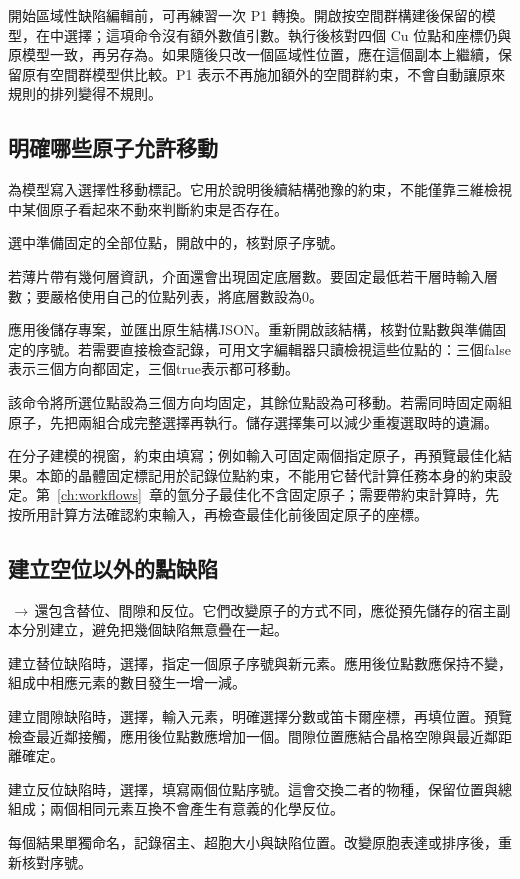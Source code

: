 開始區域性缺陷編輯前，可再練習一次 P1 轉換。開啟按空間群構建後保留的模型，在中選擇；這項命令沒有額外數值引數。執行後核對四個 Cu 位點和座標仍與原模型一致，再另存為。如果隨後只改一個區域性位置，應在這個副本上繼續，保留原有空間群模型供比較。P1 表示不再施加額外的空間群約束，不會自動讓原來規則的排列變得不規則。

\subsection{明確哪些原子允許移動}\label{sec:fixed-sites-reference}

為模型寫入選擇性移動標記。它用於說明後續結構弛豫的約束，不能僅靠三維檢視中某個原子看起來不動來判斷約束是否存在。

\begin{steps}
  \item 選中準備固定的全部位點，開啟中的，核對原子序號。
  \item 若薄片帶有幾何層資訊，介面還會出現固定底層數。要固定最低若干層時輸入層數；要嚴格使用自己的位點列表，將底層數設為0。
  \item 應用後儲存專案，並匯出原生結構JSON。重新開啟該結構，核對位點數與準備固定的序號。若需要直接檢查記錄，可用文字編輯器只讀檢視這些位點的：三個false表示三個方向都固定，三個true表示都可移動。
\end{steps}

該命令將所選位點設為三個方向均固定，其餘位點設為可移動。若需同時固定兩組原子，先把兩組合成完整選擇再執行。儲存選擇集可以減少重複選取時的遺漏。

在分子建模的視窗，約束由填寫；例如輸入可固定兩個指定原子，再預覽最佳化結果。本節的晶體固定標記用於記錄位點約束，不能用它替代計算任務本身的約束設定。第~\ref{ch:workflows}~章的氫分子最佳化不含固定原子；需要帶約束計算時，先按所用計算方法確認約束輸入，再檢查最佳化前後固定原子的座標。

\subsection{建立空位以外的點缺陷}\label{sec:other-defects-reference}

\,$\rightarrow$\,還包含替位、間隙和反位。它們改變原子的方式不同，應從預先儲存的宿主副本分別建立，避免把幾個缺陷無意疊在一起。

\begin{steps}
  \item 建立替位缺陷時，選擇，指定一個原子序號與新元素。應用後位點數應保持不變，組成中相應元素的數目發生一增一減。
  \item 建立間隙缺陷時，選擇，輸入元素，明確選擇分數或笛卡爾座標，再填位置。預覽檢查最近鄰接觸，應用後位點數應增加一個。間隙位置應結合晶格空隙與最近鄰距離確定。
  \item 建立反位缺陷時，選擇，填寫兩個位點序號。這會交換二者的物種，保留位置與總組成；兩個相同元素互換不會產生有意義的化學反位。
  \item 每個結果單獨命名，記錄宿主、超胞大小與缺陷位置。改變原胞表達或排序後，重新核對序號。
\end{steps}

